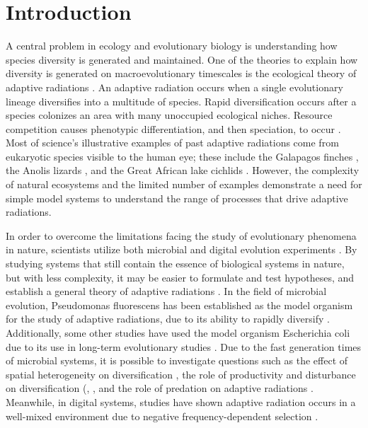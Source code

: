 \documentclass[10pt]{article}
\begin{document}
\section{Introduction}
A central problem in ecology and evolutionary biology is understanding how species diversity is generated and maintained. One of the theories to explain how diversity is generated on macroevolutionary timescales is the ecological theory of adaptive radiations \cite{schluter2000ecology}. An adaptive radiation occurs when a single evolutionary lineage diversifies into a multitude of species. Rapid diversification occurs after a species colonizes an area with many unoccupied ecological niches. Resource competition causes phenotypic differentiation, and then speciation, to occur \cite{schluter2000ecology}. Most of science's illustrative examples of past adaptive radiations come from eukaryotic species visible to the human eye; these include the Galapagos finches \cite{grant2011and},
the Anolis lizards \cite{losos2009lizards}, and the Great African lake cichlids \cite{seehausen2006african}. However, the complexity of natural ecosystems and the limited number of examples demonstrate a need for simple model systems to understand the range of processes that drive adaptive radiations.

In order to overcome the limitations facing the study of evolutionary phenomena in nature, scientists utilize both microbial and digital evolution experiments \cite{kawecki2012experimental}.
By studying systems that still contain the essence of biological systems in nature, but with less complexity, it may be easier to formulate and test hypotheses, and establish a general theory of adaptive radiations \cite{kassen2009toward}.
In the field of microbial evolution, Pseudomonas fluorescens has been established as the model organism for the study of adaptive radiations, due to its ability to rapidly diversify \cite{spiers2002adaptive}.
Additionally, some other studies have used the model organism Escherichia coli due to its use in long-term evolutionary studies \cite{rosenzweig1994microbial,friesen2004experimental,le2012ecological}.
Due to the fast generation times of microbial systems, it is possible to investigate questions such as the effect of spatial heterogeneity on diversification \cite{rainey1998adaptive}, the role of productivity and disturbance on diversification (\cite{kassen2000diversity}, \cite{buckling2000disturbance,kassen2004ecological}, and the role of predation on adaptive radiations \cite{meyer2007effects}.
Meanwhile, in digital systems, studies have shown adaptive radiation occurs in a well-mixed environment due to negative frequency-dependent selection \cite{chow2004adaptive}.
\end{document}
